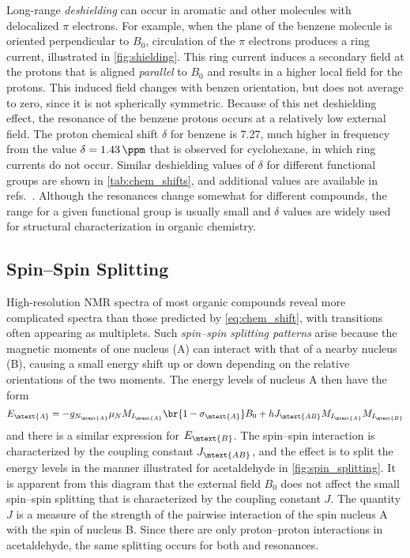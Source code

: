 \documentclass[nobib,nofonts,nols,nohyper]{tufte-handout}
\begin{document}
Long-range \emph{deshielding} can occur in aromatic and other molecules with delocalized \( \pi \) electrons. 
For example, when the plane of the benzene molecule is oriented perpendicular to \( B_0 \), circulation of the \( \pi \) electrons produces a ring current, illustrated in \cref{fig:shielding}. 
This ring current induces a secondary field at the protons that is aligned \emph{parallel} to \( B_0 \) and results in a higher local field for the protons. 
This induced field changes with benzen orientation, but does not average to zero, since it is not spherically symmetric. 
Because of this net deshielding effect, the resonance of the benzene protons occurs at a relatively low external field. 
The proton chemical shift \( \delta  \) for benzene is \SI{7.27}{\ppm}, much higher in frequency from the value \( \delta = \SI{1.43}{\ppm} \) that is observed for cyclohexane, in which ring currents do not occur. 
Similar deshielding values of \( \delta \) for different functional groups are shown in \cref{tab:chem_shifts}, and additional values are available in refs.~\autocite{davis1965advanced,pople1959nmr,silverstein2005spec,sdbs2020,aldrich1993nmr}.
Although the resonances change somewhat for different compounds, the range for a given functional group is usually small and \( \delta \) values are widely used for structural characterization in organic chemistry. 



\subsection{Spin--Spin Splitting} %
\label{sub:spin_spin_splitting}

High-resolution NMR spectra of most organic compounds reveal more complicated spectra than those predicted by \cref{eq:chem_shift}, with transitions often appearing as multiplets.
Such \emph{spin--spin splitting patterns} arise because the magnetic moments of one nucleus (A) can interact with that of a nearby nucleus (B), causing a small energy shift up or down depending on the relative orientations of the two moments. 
The energy levels of nucleus A then have the form 
\begin{equation}
	E_\mtext{A} = -g_{N_\mtext{A}} \mu_N M_{I_\mtext{A}} \br{1-\sigma_\mtext{A}} B_0
		+ h J_\mtext{AB} M_{I_\mtext{A}} M_{I_\mtext{B}}
	\label{eq:j_coupling}
\end{equation}
and there is a similar expression for \( E_\mtext{B} \). 
The spin--spin interaction is characterized by the coupling constant \( J_\mtext{AB} \), and the effect is to split the energy levels in the manner illustrated for acetaldehyde in \cref{fig:spin_splitting}. 
It is apparent from this diagram that the external field \( B_0 \) does not affect the small spin--spin splitting that is characterized by the coupling constant \( J \). 
The quantity \( J \) is a measure of the strength of the pairwise interaction of the spin nucleus A with the spin of nucleus B. 
Since there are only proton--proton interactions in acetaldehyde, the same splitting occurs for both  and  resonances. 
\end{document}
